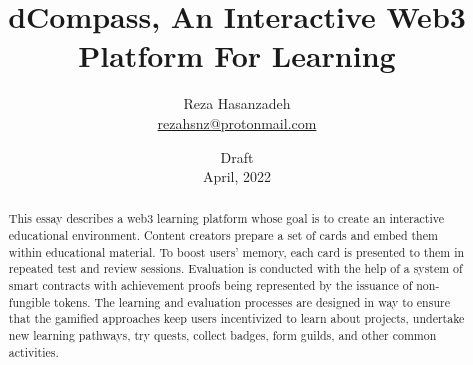 \documentclass[12pt, a4paper]{article}
\title{dCompass, An Interactive Web3 Platform For Learning}
\author{Reza Hasanzadeh \\ \href{mailto:rezahsnz@protonmail.com}{rezahsnz@protonmail.com}}
\date{Draft \\ April, 2022}
\begin{document}
\maketitle

\begin{abstract}
This essay describes a web3 learning platform whose goal is to create an interactive educational environment. Content creators prepare a set of cards and embed them within educational material. To boost users’ memory, each card is presented to them in repeated test and review sessions. Evaluation is conducted with the help of a system of smart contracts with achievement proofs being represented by the issuance of non-fungible tokens. The learning and evaluation processes are designed in way to ensure that the gamified approaches keep users incentivized to learn about projects, undertake new learning pathways, try quests, collect badges, form guilds, and other common activities.
\end{abstract}
\end{document}
